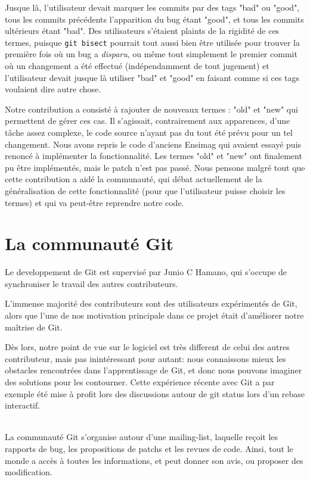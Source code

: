 \documentclass[a4paper, 12pt]{article}
\newcommand{\gitcmd}[1]{\texttt{#1}}
\begin{document}
Jusque là, l'utilisateur devait marquer les commits par des tags "bad" ou "good", tous les commits précédents l'apparition du bug étant "good", et tous les commits ultérieurs étant "bad". Des utilisateurs s'étaient plaints de la rigidité de ces termes, puisque \gitcmd{git bisect} pourrait tout aussi bien être utilisée pour trouver la première fois où un bug a \emph{disparu}, ou même tout simplement le premier commit où un changement a été effectué (indépendamment de tout jugement) et l'utilisateur devait jusque là utiliser "bad" et "good" en faisant comme si ces tags voulaient dire autre chose.

Notre contribution a consisté à rajouter de nouveaux termes : "old" et "new" qui permettent de gérer ces cas. Il s'agissait, contrairement aux apparences, d'une tâche assez complexe, le code source n'ayant pas du tout été prévu pour un tel changement. Nous avons repris le code d'anciens Ensimag qui avaient essayé puis renoncé à implémenter la fonctionnalité. Les termes "old" et "new" ont finalement pu être implémentés, mais le patch n'est pas passé. Nous pensons malgré tout que cette contribution a aidé la communauté, qui débat actuellement de la généralisation de cette fonctionnalité (pour que l'utilisateur puisse choisir les termes) et qui va peut-être reprendre notre code.


\section{La communauté Git}

Le developpement de Git est supervisé par Junio C Hamano, qui s'occupe de synchroniser le travail des autres contributeurs.

L'immense majorité des contributeurs sont des utilisateurs expérimentés de Git, alors que l'une de nos motivation principale dans ce projet était d'améliorer notre maîtrise de Git.

Dès lors, notre point de vue sur le logiciel est très different de celui des autres contributeur, mais pas inintéressant pour autant: nous connaissons mieux les obstacles rencontrées dans l'apprentissage de Git, et donc nous pouvons imaginer des solutions pour les contourner. Cette expérience récente avec Git a par exemple été mise à profit lors des discussions autour de git status lors d'un rebase interactif.

~\\

La communauté Git s'organise autour d'une mailing-list, laquelle reçoit les rapports de bug, les propositions de patchs et les revues de code. Ainsi, tout le monde a accès à toutes les informations, et peut donner son avis, ou proposer des modification.
\end{document}
